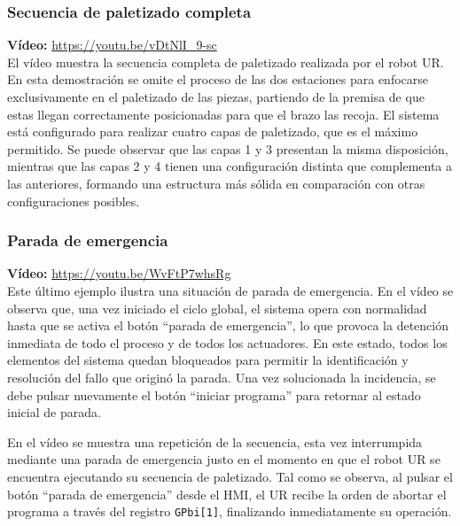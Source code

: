 \clearpage

\subsubsection{Secuencia de paletizado completa}

\textbf{Vídeo:} \url{https://youtu.be/vDtNlI_9-sc} \\

El vídeo muestra la secuencia completa de paletizado realizada por el robot UR. En esta demostración se omite el proceso de las dos estaciones para enfocarse exclusivamente en el paletizado de las piezas, partiendo de la premisa de que estas llegan correctamente posicionadas para que el brazo las recoja. El sistema está configurado para realizar cuatro capas de paletizado, que es el máximo permitido. Se puede observar que las capas 1 y 3 presentan la misma disposición, mientras que las capas 2 y 4 tienen una configuración distinta que complementa a las anteriores, formando una estructura más sólida en comparación con otras configuraciones posibles. \\

\subsubsection{Parada de emergencia}

\textbf{Vídeo:} \url{https://youtu.be/WvFtP7whsRg} \\

Este último ejemplo ilustra una situación de parada de emergencia. En el vídeo se observa que, una vez iniciado el ciclo global, el sistema opera con normalidad hasta que se activa el botón “parada de emergencia”, lo que provoca la detención inmediata de todo el proceso y de todos los actuadores. En este estado, todos los elementos del sistema quedan bloqueados para permitir la identificación y resolución del fallo que originó la parada. Una vez solucionada la incidencia, se debe pulsar nuevamente el botón “iniciar programa” para retornar al estado inicial de parada.

En el vídeo se muestra una repetición de la secuencia, esta vez interrumpida mediante una parada de emergencia justo en el momento en que el robot UR se encuentra ejecutando su secuencia de paletizado. Tal como se observa, al pulsar el botón “parada de emergencia” desde el HMI, el UR recibe la orden de abortar el programa a través del registro \texttt{GPbi[1]}, finalizando inmediatamente su operación.


